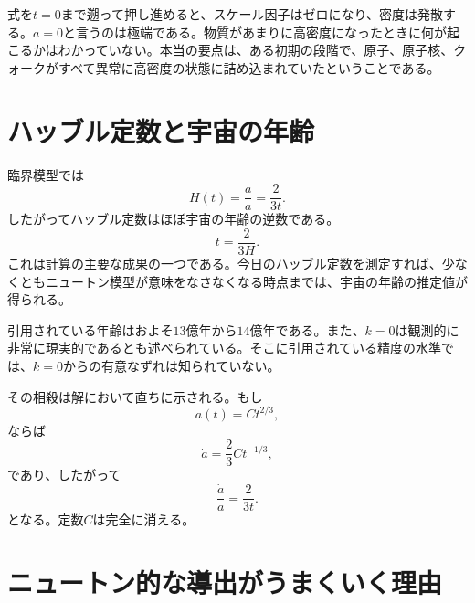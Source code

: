 式を\(t=0\)まで遡って押し進めると、スケール因子はゼロになり、密度は発散する。\(a=0\)と言うのは極端である。物質があまりに高密度になったときに何が起こるかはわかっていない。本当の要点は、ある初期の段階で、原子、原子核、クォークがすべて異常に高密度の状態に詰め込まれていたということである。

\section{ハッブル定数と宇宙の年齢}

臨界模型では
\begin{equation}
H(t)=\frac{\dot a}{a}=\frac{2}{3t}.
\end{equation}
したがってハッブル定数はほぼ宇宙の年齢の逆数である。
\begin{equation}
t=\frac{2}{3H}.
\end{equation}
これは計算の主要な成果の一つである。今日のハッブル定数を測定すれば、少なくともニュートン模型が意味をなさなくなる時点までは、宇宙の年齢の推定値が得られる。

引用されている年齢はおよそ\(13\)億年から\(14\)億年である。また、\(k=0\)は観測的に非常に現実的であるとも述べられている。そこに引用されている精度の水準では、\(k=0\)からの有意なずれは知られていない。

\begin{classroomqa}
\end{classroomqa}

その相殺は解において直ちに示される。もし
\begin{equation}
a(t)=Ct^{2/3},
\end{equation}
ならば
\begin{equation}
\dot a=\frac{2}{3}Ct^{-1/3},
\end{equation}
であり、したがって
\begin{equation}
\frac{\dot a}{a}=\frac{2}{3t}.
\end{equation}
となる。定数\(C\)は完全に消える。

\section{ニュートン的な導出がうまくいく理由}

